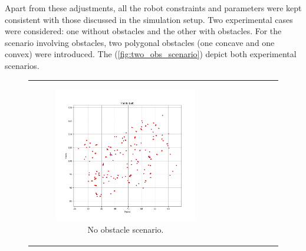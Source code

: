 \vspace{3mm}   


Apart from these adjustments, all the robot constraints and parameters were kept consistent with those discussed in the simulation setup. Two experimental cases were considered: one without obstacles and the other with obstacles. For the scenario involving obstacles, two polygonal obstacles (one concave and one convex) were introduced. The (\autoref{fig:two_obs_scenario}) depict both experimental scenarios. 


\begin{figure}[H]
    \centering
    \begin{tabular}{cc} 
        \begin{subfigure}{0.4\textwidth}
            \centering
            \includegraphics[width=\textwidth]{Images/real_robot/no_obs_scene.png}
            \caption{No obstacle scenario.}
        \end{subfigure} 
        &
        \begin{subfigure}{0.4\textwidth}
            \centering

\end{subfigure}
\end{tabular}
\end{figure}
